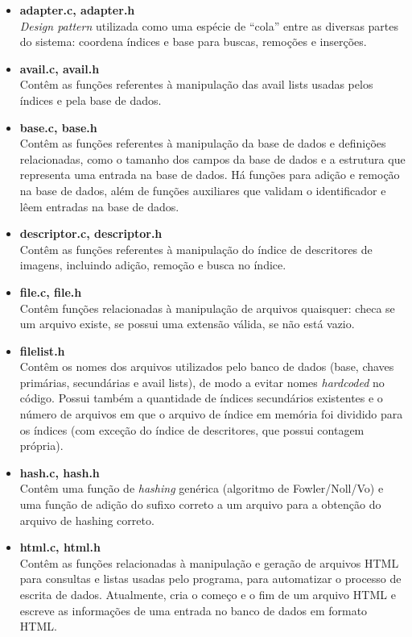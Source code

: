 \documentclass{article}
\begin{document}
\begin{itemize}
\item \textbf{adapter.c, adapter.h}\\
	\textit{Design pattern} utilizada como uma espécie de ``cola'' entre as diversas partes do sistema: coordena índices e base para buscas, remoções e inserções.

\item \textbf{avail.c, avail.h}\\
	Contêm as funções referentes à manipulação das avail lists usadas pelos índices e pela base de dados.

\item \textbf{base.c, base.h}\\
	Contêm as funções referentes à manipulação da base de dados e definições relacionadas, como o tamanho dos campos da base de dados e a estrutura que representa uma entrada na base de dados. Há funções para adição e remoção na base de dados, além de funções auxiliares que validam o identificador e lêem entradas na base de dados.

\item \textbf{descriptor.c, descriptor.h}\\
	Contêm as funções referentes à manipulação do índice de descritores de imagens, incluindo adição, remoção e busca no índice.

 \item \textbf{file.c, file.h}\\
	Contêm funções relacionadas à manipulação de arquivos quaisquer: checa se um arquivo existe, se possui uma extensão válida, se não está vazio.

\item \textbf{filelist.h}\\
	Contêm os nomes dos arquivos utilizados pelo banco de dados (base, chaves primárias, secundárias e avail lists), de modo a evitar nomes \textit{hardcoded} no código. Possui também a quantidade de índices secundários existentes e o número de arquivos em que o arquivo de índice em memória foi dividido para os índices (com exceção do índice de descritores, que possui contagem própria).

\item \textbf{hash.c, hash.h}\\
	Contêm uma função de \textit{hashing} genérica (algoritmo de Fowler/Noll/Vo) e uma função de adição do sufixo correto a um arquivo para a obtenção do arquivo de hashing correto.

 \item \textbf{html.c, html.h}\\
	Contêm as funções relacionadas à manipulação e geração de arquivos HTML para consultas e listas usadas pelo programa, para automatizar o processo de escrita de dados. Atualmente, cria o começo e o fim de um arquivo HTML e escreve as informações de uma entrada no banco de dados em formato HTML.


\end{itemize}
\end{document}
